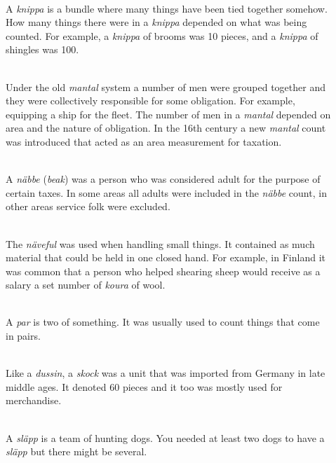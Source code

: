 \documentclass[a4paper]{article}
\newcommand{\samplefont}{\fontsize{16}{16}\abcursivefamily\spaceskip0.2em}
\newcommand{\sample}[1]{{\samplefont #1 \strut}}
\begin{document}
\begin{description}
\item [\sample{knippo} \emph{knippa}, \emph{nippu} ] \mbox{} \\
  A \emph{knippa} is a bundle where many things have been tied
  together somehow. How many things there were in a \emph{knippa}
  depended on what was being counted. For example, a \emph{knippa} of
  brooms was 10 pieces, and a \emph{knippa} of shingles was 100.

\item [\sample{mantal}, \emph{mantal}, \emph{manttaali} ] \mbox{} \\
  Under the old \emph{mantal} system a number of men were grouped
  together and they were collectively responsible for some obligation.
  For example, equipping a ship for the fleet. The number of men in a
  \emph{mantal} depended on area and the nature of obligation. In the
  16th century a new \emph{mantal} count was introduced that acted as
  an area measurement for taxation.

\item [\sample{nebbe}, \emph{näbbe}, \emph{nokka}] \mbox{} \\
  A \emph{näbbe} (\emph{beak}) was a person who was considered adult
  for the purpose of certain taxes. In some areas all adults were
  included in the \emph{näbbe} count, in other areas service folk were
  excluded.

\item [\sample{näuefull}, \sample{göpen} \emph{näveful},\emph{göpen}, \emph{koura} ] \mbox{} \\
  The \emph{näveful} was used when handling small things. It contained
  as much material that could be held in one closed hand. For example,
  in Finland it was common that a person who helped shearing sheep
  would receive as a salary a set number of \emph{koura} of wool.

\item [\sample{par} \emph{par}, \emph{pari} ] \mbox{} \\
  A \emph{par} is two of something. It was usually used to count
  things that come in pairs. 

\item [\sample{skock} \emph{skock}, \emph{parvi}] \mbox{} \\
  Like a \emph{dussin}, a \emph{skock} was a unit that was imported
  from Germany in late middle ages. It denoted 60 pieces and it too
  was mostly used for merchandise.

\item [\sample{släpp} \emph{släpp}, \emph{ajue}] \mbox{} \\
  A \emph{släpp} is a team of hunting dogs. You needed at least two
  dogs to have a \emph{släpp} but there might be several. 


\end{description}
\end{document}
